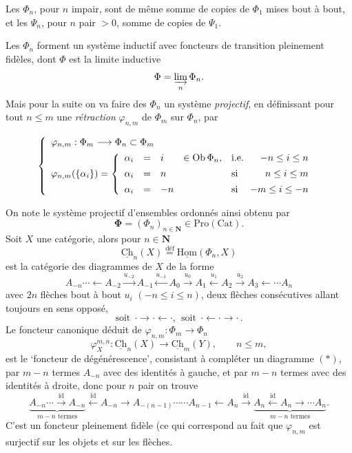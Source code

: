 \documentclass[11pt]{article}
\newcommand{\printedpage}[1]{\marginpar{\footnotesize p.~#1}}
\newcommand{\msp}[1]{\marginpar{\footnotesize [#1]}}
\newcommand{\Ob}{\operatorname{Ob}}
\newcommand{\uCh}{\underline{\mathrm{Ch}}}
\newcommand{\uHom}{\underline{\mathrm{Hom}}}
\newcommand{\bPhi}{\boldsymbol{\Phi}}
\begin{document}
Les $\Phi_n$, pour $n$ impair, sont de même somme de copies de $\Phi_1$ mises bout à bout, et les $\Psi_n$, pour $n$ pair $>0$, somme de copies de $\Psi_1$.

\clearpage

\printedpage{2}

Les $\Phi_n$ forment un système inductif avec foncteurs de transition pleinement fidèles, dont $\Phi$ est la limite inductive
\[
\Phi=\varinjlim_n\Phi_n.
\]
Mais pour la suite on va faire des $\Phi_n$ un système \textit{projectif}, en définissant pour tout $n\le m$ une \textit{rétraction} $\varphi_{n,m}$ de $\Phi_m$ sur $\Phi_n$, par

\msp{page 2}
\[
\left\{
\begin{array}{l}
\varphi_{n,m}:\Phi_m\longrightarrow\Phi_n\subset\Phi_m\\[1ex]
\varphi_{n,m}(\{\alpha_i\})=
\left\{
\begin{array}{rcll@{\quad}l@{\ \ }r}
\alpha_i & = & i & \in\Ob\Phi_n, & \text{i.e.} & -n\le i\le n\\[1ex]
\alpha_i & = & n & & \text{si} & n\le i\le m\\[1ex]
\alpha_i & = & -n & & \text{si} & -m\le i\le -n
\end{array}
\right.
\end{array}
\right.
\]

On note le système projectif d'ensembles ordonnés ainsi obtenu par
\[
\bPhi=(\Phi_n)_{n\in\mathbf{N}}\in\mathrm{Pro}(\mathrm{Cat}).
\]
Soit $X$ une catégorie, alors pour $n\in\mathbf{N}$
\[
\uCh_n(X)\overset{\text{déf}}{=}\uHom(\Phi_n,X)
\]
est la catégorie des diagrammes de $X$ de la forme
\[
A_{-n}\cdots\longleftarrow A_{-2}\xrightarrow{u_{-2}}A_{-1}\xleftarrow{u_{-1}}A_0\xrightarrow{u_0}A_1\xleftarrow{u_1}A_2\xrightarrow{u_2}A_3\longleftarrow\cdots A_n
\tag*{$(*)$}
\]
avec $2n$ flèches bout à bout $u_i$ $(-n\le i\le n)$, deux flèches consécutives allant toujours en sens opposé,
\[
\text{soit}\ \ \cdot\longrightarrow\cdot\longleftarrow\cdot,\ \ \text{soit}\ \ \cdot\longleftarrow\cdot\longrightarrow\cdot\,.
\]
Le foncteur canonique déduit de $\varphi_{n,m}:\Phi_m\longrightarrow\Phi_n$
\[
\varphi_X^{m,n}:\uCh_n(X)\longrightarrow\uCh_m(Y),\qquad n\le m,
\]
\printedpage{3}
 est le `foncteur de dégénérescence', consistant à compléter un diagramme $(*)$, par $m-n$ termes $A_{-n}$ avec des identités à gauche, et par $m-n$ termes avec des identités à droite, donc pour $n$ pair on trouve
\[
\underbrace{A_{-n}\cdots\xrightarrow{\text{id}}A_{-n}}_{m-n\text{ termes}}\xleftarrow{\text{id}}A_{-n}\longrightarrow A_{-(n-1)}\cdots\cdots A_{n-1}\longleftarrow A_n\xrightarrow{\text{id}}\underbrace{A_n\xleftarrow{\text{id}}A_n\longrightarrow\cdots A_n}_{m-n\text{ termes}}.
\]
C'est un foncteur pleinement fidèle (ce qui correspond au fait que $\varphi_{n,m}$ est surjectif sur les objets et sur les flèches. %
\end{document}
